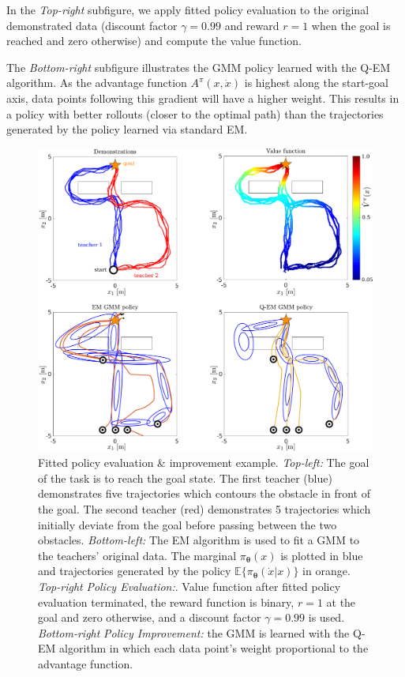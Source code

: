 \documentclass[final,3p,times,twocolumn]{elsarticle}
\newcommand{\X}{x}
\newcommand{\U}{\dot{x}}
\newcommand{\Param}{\boldsymbol{\theta}}
\begin{document}
In the \textit{Top-right} subfigure, we apply fitted policy evaluation to the original demonstrated data (discount 
factor $\gamma=0.99$ and reward $r=1$ when the goal is reached and zero otherwise) and compute the value function.

The \textit{Bottom-right} subfigure illustrates the GMM policy learned with the Q-EM algorithm. As 
the advantage function $ A^{\pi}(\X,\U)$ is highest along the start-goal axis, data points
following this gradient will have a higher weight. This results in a policy with better 
rollouts (closer to the optimal path) than the trajectories generated by the policy learned via standard EM. 

\begin{figure}
 \centering
 \setlength\fboxsep{0pt}
  \setlength\fboxrule{0.25pt}
  \includegraphics[width=\textwidth]{./Figures/fpe_example.pdf}
 \caption{Fitted policy evaluation \& improvement example. 
  \textit{Top-left:} The goal of the task is to reach the goal state. The first teacher (blue) demonstrates 
  five trajectories which contours the obstacle in front of the goal. The second teacher (red) demonstrates 
  5 trajectories which initially deviate from the goal before passing between the two obstacles. 
  \textit{Bottom-left:} The EM algorithm is used to fit a GMM to the teachers' original data. 
  The marginal $\pi_{\Param}(\X)$ is plotted in blue and trajectories generated by the 
  policy $\mathbb{E}\{\pi_{\Param}(\U|\X)\}$ in orange. \textit{Top-right} \textit{Policy Evaluation:}.  
  Value function after fitted policy evaluation terminated, the reward function 
  is binary, $r=1$ at the goal and zero otherwise, and a discount factor $\gamma = 0.99$ is used.
  \textit{Bottom-right} \textit{Policy Improvement:} the GMM is learned with the Q-EM algorithm in which 
  each data point's weight proportional to the advantage function.
 }
  \label{fig:fpe_example}
\end{figure}
\end{document}
